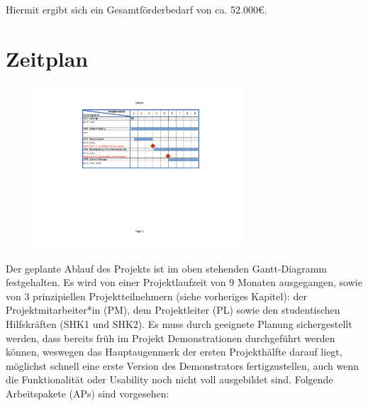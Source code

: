 \documentclass[11pt]{article}
\begin{document}
Hiermit ergibt sich ein Gesamtförderbedarf von ca. 52.000\euro.

\newpage
\renewcommand{\thesection}{8}
\section{Zeitplan}
\begin{figure}
\centering
\includegraphics[viewport=2.5in 3.5in 8.8in 7.5in,width=0.7\textwidth,clip]{gantt.pdf}
\end{figure}
Der geplante Ablauf des Projekts ist im oben stehenden Gantt-Diagramm festgehalten.
Es wird von einer Projektlaufzeit von 9 Monaten ausgegangen, sowie von 3 prinzipiellen
Projektteilnehmern (siehe vorheriges Kapitel): der Projektmitarbeiter*in (PM), dem Projektleiter (PL) sowie den studentischen Hilfskräften (SHK1 und SHK2). Es muss durch geeignete Planung sichergestellt werden, dass bereits früh im Projekt Demonstrationen durchgeführt werden können, weswegen das Hauptaugenmerk der ersten Projekthälfte darauf liegt, möglichst schnell eine erste Version des Demonstrators fertigzustellen, auch wenn die Funktionalität oder Usability noch nicht voll ausgebildet sind. Folgende Arbeitspakete (APs) sind vorgesehen:
\end{document}
